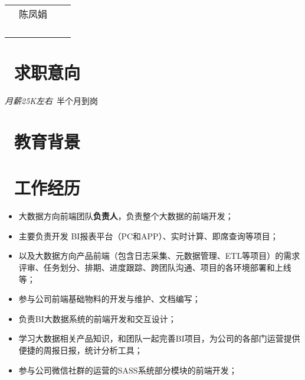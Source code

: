\documentclass{resume}
\begin{document}

\Large{
  \begin{tabu}{ l l r r }
    & \scshape{陈凤娟} &  & \\
    &  &  \\
    &  &  \\
    &  &  \\
    &  & 
  \end{tabu}
}

\normalsize
\section{\faInfo\  求职意向}
\textit{月薪25K左右}\ 半个月到岗

\section{\faGraduationCap\  教育背景}


\section{\faGraduationCap\  工作经历}

\begin{onehalfspacing}
\begin{itemize}
  \item 大数据方向前端团队\textbf{负责人}，负责整个大数据的前端开发；
  \item 主要负责开发 BI报表平台（PC和APP）、实时计算、即席查询等项目；
  \item 以及大数据方向产品前端（包含日志采集、元数据管理、ETL等项目）的需求评审、任务划分、排期、进度跟踪、跨团队沟通、项目的各环境部署和上线等；
  \item 参与公司前端基础物料的开发与维护、文档编写；
\end{itemize}
\end{onehalfspacing}

\begin{onehalfspacing}
\begin{itemize}
  \item 负责BI大数据系统的前端开发和交互设计；
  \item 学习大数据相关产品知识，和团队一起完善BI项目，为公司的各部门运营提供便捷的周报日报，统计分析工具；
  \item 参与公司微信社群的运营的SASS系统部分模块的前端开发；
\end{itemize}
\end{onehalfspacing}
\end{document}
